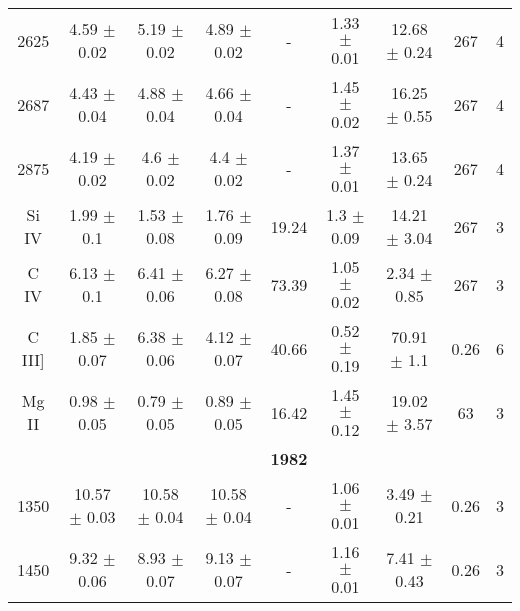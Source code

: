 \documentclass[
  man,floatsintext]{apa6}
\begin{document}
\begin{landscape}
\begin{longtable}{@{\extracolsep{\fill}} cc cc cc cc c}
    2625    &   4.59    $\pm$   0.02    &   5.19    $\pm$   0.02    &   4.89    $\pm$   0.02    &   -   &   1.33    $\pm$   0.01    &   12.68   $\pm$   0.24    &   267 &   4   \\  
    
    2687    &   4.43    $\pm$   0.04    &   4.88    $\pm$   0.04    &   4.66    $\pm$   0.04    &   -   &   1.45    $\pm$   0.02    &   16.25   $\pm$   0.55    &   267 &   4   \\  
    
    2875    &   4.19    $\pm$   0.02    &   4.6 $\pm$   0.02    &   4.4 $\pm$   0.02    &   -   &   1.37    $\pm$   0.01    &   13.65   $\pm$   0.24    &   267 &   4   \\  \hline
    
    Si IV   &   1.99    $\pm$   0.1 &   1.53    $\pm$   0.08    &   1.76    $\pm$   0.09    &   19.24   &   1.3 $\pm$   0.09    &   14.21   $\pm$   3.04    &   267 &   3   \\  
    C IV    &   6.13    $\pm$   0.1 &   6.41    $\pm$   0.06    &   6.27    $\pm$   0.08    &   73.39   &   1.05    $\pm$   0.02    &   2.34    $\pm$   0.85    &   267 &   3   \\  
    
    C III]  &   1.85    $\pm$   0.07    &   6.38    $\pm$   0.06    &   4.12    $\pm$   0.07    &   40.66   &   0.52    $\pm$   0.19    &   70.91   $\pm$   1.1 &   0.26    &   6   \\  
    
    Mg II   &   0.98    $\pm$   0.05    &   0.79    $\pm$   0.05    &   0.89    $\pm$   0.05    &   16.42   &   1.45    $\pm$   0.12    &   19.02   $\pm$   3.57    &   63  &   3   \\  \hline\hline
    
    &               &               &                   &   \textbf{1982}               &               &       &       \\      
    
    1350    &   10.57   $\pm$   0.03    &   10.58   $\pm$   0.04    &   10.58   $\pm$   0.04    &   -   &   1.06    $\pm$   0.01    &   3.49    $\pm$   0.21    &   0.26    &   3   \\  
    
    1450    &   9.32    $\pm$   0.06    &   8.93    $\pm$   0.07    &   9.13    $\pm$   0.07    &   -   &   1.16    $\pm$   0.01    &   7.41    $\pm$   0.43    &   0.26    &   3   \\  
                                                                                                                    

\end{longtable}
\end{landscape}
\end{document}
